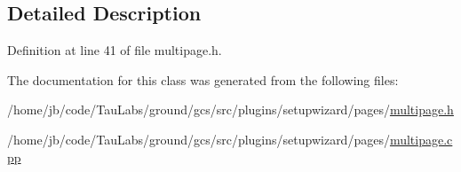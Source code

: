 \subsection{\-Detailed \-Description}


\-Definition at line 41 of file multipage.\-h.



\-The documentation for this class was generated from the following files\-:\begin{DoxyCompactItemize}
\item 
/home/jb/code/\-Tau\-Labs/ground/gcs/src/plugins/setupwizard/pages/\hyperlink{multipage_8h}{multipage.\-h}\item 
/home/jb/code/\-Tau\-Labs/ground/gcs/src/plugins/setupwizard/pages/\hyperlink{multipage_8cpp}{multipage.\-cpp}\end{DoxyCompactItemize}
